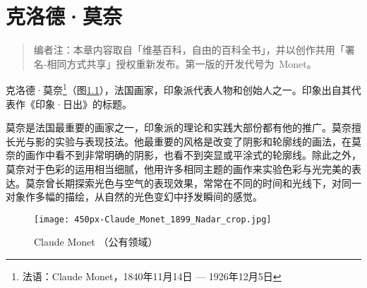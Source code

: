 % 
%
%
% 
%
%
\chapter{克洛德·莫奈}

\begin{quotation}
    编者注：本章内容取自「维基百科，自由的百科全书」，并以创作共用「署名-相同方式共享」授权重新发布。\xjtuthesis 第一版的开发代号为~Monet。
\end{quotation}

    克洛德·莫奈\footnote{法语：Claude Monet，1840年11月14日 --- 1926年12月5日}（图\ref{fig:claude-monet}），法国画家，印象派代表人物和创始人之一。印象出自其代表作《印象·日出》的标题。

    莫奈是法国最重要的画家之一，印象派的理论和实践大部份都有他的推广。莫奈擅长光与影的实验与表现技法。他最重要的风格是改变了阴影和轮廓线的画法，在莫奈的画作中看不到非常明确的阴影，也看不到突显或平涂式的轮廓线。除此之外，莫奈对于色彩的运用相当细腻，他用许多相同主题的画作来实验色彩与光完美的表达。莫奈曾长期探索光色与空气的表现效果，常常在不同的时间和光线下，对同一对象作多幅的描绘，从自然的光色变幻中抒发瞬间的感觉。

    \begin{figure}[h!]
      \centering
      \texttt{[image: 450px-Claude\_Monet\_1899\_Nadar\_crop.jpg]}
      \caption{Claude Monet （公有领域）}
      \label{fig:claude-monet}
    \end{figure}

